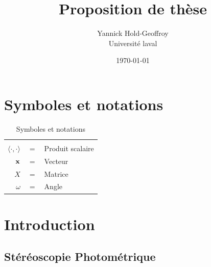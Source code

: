 \documentclass{report}
\title{Proposition de th\`ese}
\author{Yannick Hold-Geoffroy  \\
    Universit\'e laval  \\
    }
\date{\today}
\begin{document}
 

\maketitle

\tableofcontents

\newcommand{\boldomega}{\boldsymbol \omega} %
\newcommand{\boldmu}{\boldsymbol \mu} %
\newcommand{\bolddelta}{\boldsymbol \delta} %

\graphicspath{{figures/}}



\chapter*{Symboles et notations}

\begin{table}[htbp]\caption{Symboles et notations}
\centering %
\begin{tabular}{r c p{10cm} }

\hline & & \\
$\langle \cdot, \cdot \rangle$      & $=$ & Produit scalaire \\
$\bold{x}$                          & $=$ & Vecteur \\
$X$                                 & $=$ & Matrice \\
$\omega$                            & $=$ & Angle \\
\hline
\end{tabular}
\label{tab:TableOfNotationForMyResearch}
\end{table}


\chapter{Introduction}





\section{Stéréoscopie Photométrique}
\end{document}
